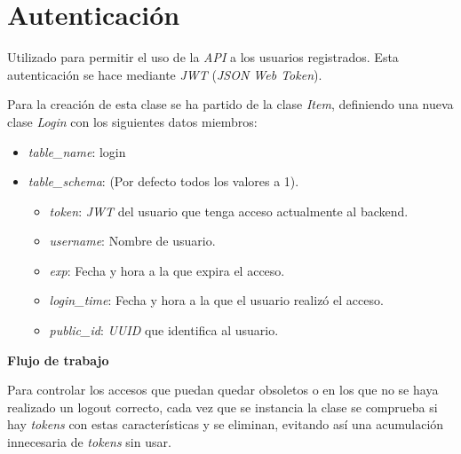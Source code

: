 \section{Autenticación}

Utilizado para permitir el uso de la \textit{API} a los usuarios registrados. Esta autenticación se hace mediante \textit{JWT} (\textit{JSON Web Token}).

Para la creación de esta clase se ha partido de la clase \textit{Item}, definiendo una nueva clase \textit{Login} con los siguientes datos miembros:
\begin{itemize}
	\item \textit{table\_name}: login
	\item \textit{table\_schema}: (Por defecto todos los valores a 1).
	\begin{itemize}
		\item \textit{token}: \textit{JWT} del usuario que tenga acceso actualmente al backend.
		\item \textit{username}: Nombre de usuario.
		\item \textit{exp}: Fecha y hora a la que expira el acceso.
		\item \textit{login\_time}: Fecha y hora a la que el usuario realizó el acceso.
		\item \textit{public\_id}: \textit{UUID} que identifica al usuario.
	\end{itemize}
\end{itemize}


\bigskip
\textbf{Flujo de trabajo}

Para controlar los accesos que puedan quedar obsoletos o en los que no se haya realizado un logout correcto, cada vez que se instancia la clase se comprueba si hay \textit{tokens} con estas características y se eliminan, evitando así una acumulación innecesaria de \textit{tokens} sin usar.

